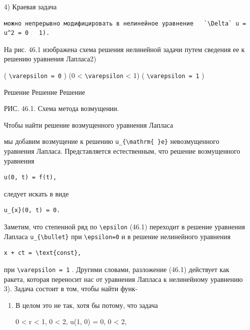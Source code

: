 \documentclass[
  ukrainian,
]{article}
\begin{document}
4) Краевая задача

\begin{verbatim}
можно непрерывно модифицировать в нелинейное уравнение   `\Delta` u = u^2 = 0   1).
\end{verbatim}

На рис. 46.1 изображена схема решения нелинейной задачи путем сведения
ее к решению уравнения Лапласа2)

( \texttt{\textbackslash{}varepsilon\ =\ 0} ) (0 \textless{}
\texttt{\textbackslash{}varepsilon} \textless{} 1) (
\texttt{\textbackslash{}varepsilon\ =\ 1} )

Решение Решение Решение

РИС. 46.1. Схема метода возмущении.

Чтобы найти решение возмущенного уравнения Лапласа

мы добавим возмущение к решению
\texttt{u\_\{\textbackslash{}mathrm\{\ \}e\}} невозмущенного уравнения
Лапласа. Представляется естественным, что решение возмущенного уравнения

\begin{verbatim}
u(0, t) = f(t),
\end{verbatim}

следует искать в виде

\begin{verbatim}
u_{x}(0, t) = 0.
\end{verbatim}

Заметим, что степенной ряд по \texttt{\textbackslash{}epsilon} (46.1)
переходит в решение уравнения Лапласа
\texttt{u\_\{\textbackslash{}bullet\}} при
\texttt{\textbackslash{}epsilon=0} и в решение нелинейного уравнения

\begin{verbatim}
x + ct = \text{const},
\end{verbatim}

при \texttt{\textbackslash{}varepsilon\ =\ 1} . Другими словами,
разложение (46.1) действует как ракета, которая переносит нас от
уравнения Лапласа к нелинейному уравнению 3). Задача состоит в том,
чтобы найти функ-

\begin{enumerate}
\def\labelenumi{\arabic{enumi})}
\item
  В целом это не так, хотя бы потому, что задача

  0 \textless{} r \textless{} 1, 0 \le \theta \textless{} 2\pi, u(1, 0)
  = 0, 0 \le \theta \textless{} 2\pi,
\end{enumerate}
\end{document}
